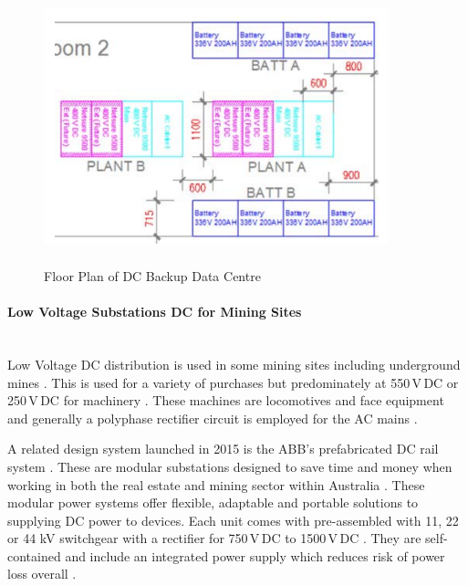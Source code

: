 \begin{figure}[H]
\hfill\includegraphics[width = 100mm, height = 80mm]{images/DC_Centre}\hspace*{\fill}
\caption{{Floor Plan of DC Backup Data Centre \cite{Lisy2015}}}
\label{fig:DC_Centre}
\end{figure} 

\newpage

\paragraph{Low Voltage Substations DC for Mining Sites}
~\\
Low Voltage DC distribution is used in some mining sites including underground mines \cite{Morley1990}. This is used for a variety of purchases but predominately at 550\,V\,DC or 250\,V\,DC for machinery \cite{Morley1990}. These machines are locomotives and face equipment and generally a polyphase rectifier circuit is employed for the AC mains \cite{Morley1990}.
\newline

A related design system launched in 2015 is the ABB's prefabricated DC rail system \cite{website:ProQuest1}. These are modular substations designed to save time and money when working in both the real estate and mining sector within Australia \cite{website:ProQuest1}. These modular power systems offer flexible, adaptable and portable solutions to supplying DC power to devices. Each unit comes with pre-assembled with 11, 22 or 44 kV switchgear with a rectifier for 750\,V\,DC to 1500\,V\,DC \cite{website:ProQuest1}. They are self-contained and include an integrated power supply which reduces risk of power loss overall \cite{website:ProQuest1}.            

